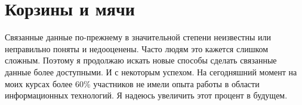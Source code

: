 \chapter{Корзины и мячи}
\label{ch:BucketsAndBalls}

Связанные данные по-прежнему в значительной степени неизвестны или неправильно поняты и недооценены. Часто людям это кажется слишком сложным. 
Поэтому я продолжаю искать новые способы сделать связанные данные более доступными. И с некоторым успехом. 
На сегодняшний момент на моих курсах более 60\% участников не имели опыта работы в области информационных технологий. Я надеюсь увеличить этот процент в будущем.
